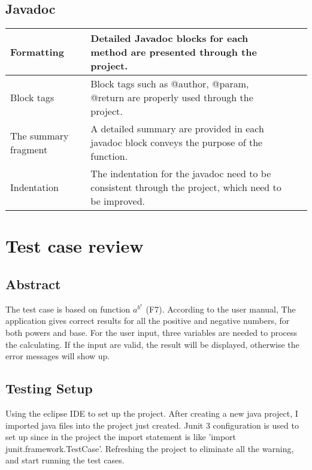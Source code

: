 \documentclass[a4paper, 11pt]{article}
\begin{document}
\subsection{Javadoc}
\indent
\begin{center}
\renewcommand\arraystretch{2.0}
\begin{tabularx}{\textwidth}{|%
   >{\hsize=1.0\hsize}X|
   >{\hsize=2.0\hsize}X|
   >{\hsize=0.5\hsize}X|
   >{\hsize=0.5\hsize}X|}
\hline
Formatting & Detailed Javadoc blocks for each method are presented through the project. \\

\hline
Block tags & Block tags such as @author, @param, @return are properly used through the project. \\

\hline
The summary fragment & A detailed summary are provided in each javadoc block conveys the purpose of the function.\\

\hline
Indentation & The indentation for the javadoc need to be consistent through the project, which need to be improved.\\

\hline
\end{tabularx}
\end{center}
\indent

\newpage

\section{Test case review}
\indent
\subsection{Abstract}
The test case is based on function $a^{b^{x}}$ (F7). According to the user manual, The application gives correct results for all the positive and negative numbers, for both powers and base. For the user input, three variables are needed to process the calculating. If the input are valid, the result will be displayed, otherwise the error messages will show up.

\subsection{Testing Setup}
Using the eclipse IDE to set up the project. After creating a new java project, I imported java files into the project just created. Junit 3 configuration is used to set up since in the project the import statement is like 'import junit.framework.TestCase'. Refreshing the project to eliminate all the warning, and start running the test cases.
\end{document}
